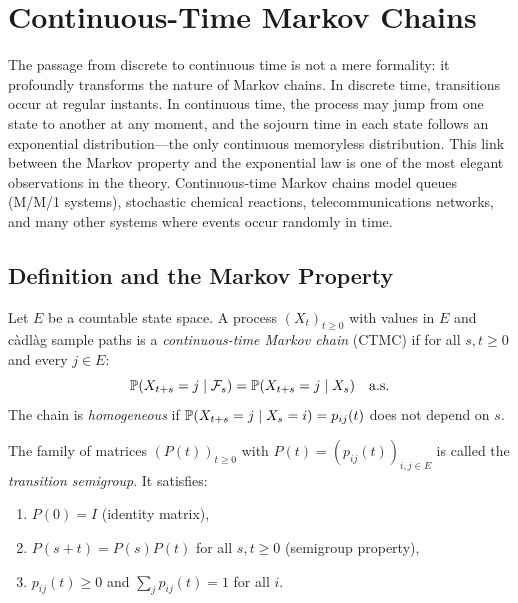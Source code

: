 \chapter{Continuous-Time Markov Chains}
\label{ch:continuous_markov}

The passage from discrete to continuous time is not a mere formality: it profoundly transforms the nature of Markov chains. In discrete time, transitions occur at regular instants. In continuous time, the process may jump from one state to another at any moment, and the sojourn time in each state follows an exponential distribution---the only continuous memoryless distribution. This link between the Markov property and the exponential law is one of the most elegant observations in the theory. Continuous-time Markov chains model queues (M/M/1 systems), stochastic chemical reactions, telecommunications networks, and many other systems where events occur randomly in time.

\section{Definition and the Markov Property}

\begin{definition}
Let $E$ be a countable state space. A process $(X_t)_{t \geq 0}$ with values
in $E$ and c\`adl\`ag sample paths is a \emph{continuous-time Markov chain} (CTMC)
if for all $s, t \geq 0$ and every $j \in E$:
\[
  \mathbb{P}(X_{t+s} = j \mid \mathcal{F}_s) = \mathbb{P}(X_{t+s} = j \mid X_s) \quad \text{a.s.}
\]
The chain is \emph{homogeneous} if $\mathbb{P}(X_{t+s} = j \mid X_s = i) = p_{ij}(t)$
does not depend on $s$.
\end{definition}

\begin{definition}
The family of matrices $(P(t))_{t \geq 0}$ with $P(t) = (p_{ij}(t))_{i,j \in E}$
is called the \emph{transition semigroup}. It satisfies:
\begin{enumerate}
  \item $P(0) = I$ (identity matrix),
  \item $P(s+t) = P(s)P(t)$ for all $s, t \geq 0$ (semigroup property),
  \item $p_{ij}(t) \geq 0$ and $\sum_j p_{ij}(t) = 1$ for all $i$.
\end{enumerate}
\end{definition}

